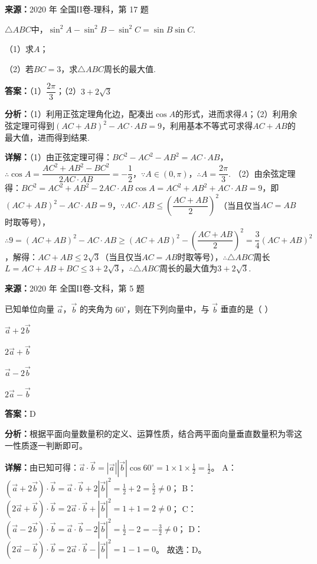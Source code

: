 \begin{question}[points=12]
\textbf{来源：}2020 年 全国II卷-理科，第 17 题\par
$\triangle ABC$中，$\sin^2A-\sin^2B-\sin^2C=\sin B\sin C$.

（1）求$A$；

（2）若$BC=3$，求$\triangle ABC$周长的最大值.
\begin{solution}
\textbf{答案：}（1）$\dfrac{2\pi}{3}$；（2）$3+2\sqrt3$

\textbf{分析：}（1）利用正弦定理角化边，配凑出$\cos A$的形式，进而求得$A$；（2）利用余弦定理可得到$(AC+AB)^2-AC\cdot AB=9$，利用基本不等式可求得$AC+AB$的最大值，进而得到结果.

\textbf{详解：}（1）由正弦定理可得：$BC^2-AC^2-AB^2=AC\cdot AB$，$\therefore\cos A=\dfrac{AC^2+AB^2-BC^2}{2AC\cdot AB}=-\dfrac12$，$\because A\in(0,\pi)$，$\therefore A=\dfrac{2\pi}{3}$.
（2）由余弦定理得：$BC^2=AC^2+AB^2-2AC\cdot AB\cos A=AC^2+AB^2+AC\cdot AB=9$，即$(AC+AB)^2-AC\cdot AB=9$，$\because AC\cdot AB\leq\left(\dfrac{AC+AB}{2}\right)^2$（当且仅当$AC=AB$时取等号），$\therefore9=(AC+AB)^2-AC\cdot AB\geq(AC+AB)^2-\left(\dfrac{AC+AB}{2}\right)^2=\dfrac34(AC+AB)^2$，解得：$AC+AB\leq2\sqrt3$（当且仅当$AC=AB$时取等号），$\therefore\triangle ABC$周长$L=AC+AB+BC\leq3+2\sqrt3$，$\therefore\triangle ABC$周长的最大值为$3+2\sqrt3$.
\end{solution}
\end{question}

\begin{question}[points=5]
\textbf{来源：}2020 年 全国II卷-文科，第 5 题\par
已知单位向量 $\vec{a}$，$\vec{b}$ 的夹角为 $60^\circ$，则在下列向量中，与 $\vec{b}$ 垂直的是（ ）
\begin{choices}
  \item $\vec{a}+2\vec{b}$
  \item $2\vec{a}+\vec{b}$
  \item $\vec{a}-2\vec{b}$
  \item $2\vec{a}-\vec{b}$
\end{choices}
\begin{solution}
\textbf{答案：}D

\textbf{分析：}根据平面向量数量积的定义、运算性质，结合两平面向量垂直数量积为零这一性质逐一判断即可。

\textbf{详解：}由已知可得：$\vec{a}\cdot\vec{b}=|\vec{a}||\vec{b}|\cos60^\circ=1\times1\times\frac{1}{2}=\frac{1}{2}$。
A：$(\vec{a}+2\vec{b})\cdot\vec{b}=\vec{a}\cdot\vec{b}+2|\vec{b}|^2=\frac{1}{2}+2=\frac{5}{2}\neq0$；
B：$(2\vec{a}+\vec{b})\cdot\vec{b}=2\vec{a}\cdot\vec{b}+|\vec{b}|^2=1+1=2\neq0$；
C：$(\vec{a}-2\vec{b})\cdot\vec{b}=\vec{a}\cdot\vec{b}-2|\vec{b}|^2=\frac{1}{2}-2=-\frac{3}{2}\neq0$；
D：$(2\vec{a}-\vec{b})\cdot\vec{b}=2\vec{a}\cdot\vec{b}-|\vec{b}|^2=1-1=0$。
故选：D。
\end{solution}
\end{question}

